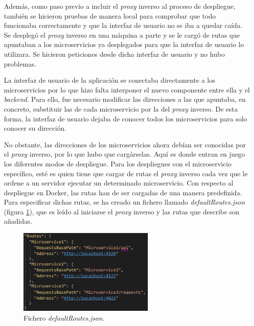 \documentclass[11pt,spanish,listoffigures]{tfgetsinf}
\begin{document}
Además, como paso previo a incluir el \emph{proxy} inverso al proceso de despliegue, también se hicieron pruebas de manera local para comprobar que todo funcionaba correctamente y que la interfaz de usuario no se iba a quedar caída. Se desplegó el \emph{proxy} inverso en una máquina a parte y se le cargó de rutas que apuntaban a los microservicios ya desplegados para que la interfaz de usuario lo utilizara. Se hicieron peticiones desde dicha interfaz de usuario y no hubo problemas.

La interfaz de usuario de la aplicación se conectaba directamente a los microservicios por lo que hizo falta interponer el nuevo componente entre ella y el \emph{backend}. Para ello, fue necesario modificar las direcciones a las que apuntaba, en concreto, substituir las de cada microservicio por la del \emph{proxy} inverso. De esta forma, la interfaz de usuario dejaba de conocer todos los microservicios para solo conocer su dirección.

No obstante, las direcciones de los microservicios ahora debían ser conocidas por el \emph{proxy} inverso, por lo que hubo que cargárselas. Aquí es donde entran en juego los diferentes modos de despliegue. Para los despliegues con el microservicio específico, esté es quien tiene que cargar de rutas el \emph{proxy} inverso cada vez que le ordene a un servidor ejecutar un determinado microservicio. Con respecto al despliegue en Docker, las rutas han de ser cargadas de una manera predefinida. Para especificar dichas rutas, se ha creado un fichero llamado \emph{defaultRoutes.json} (figura \ref{defaultRoutes}), que es leído al iniciarse el \emph{proxy} inverso y las rutas que describe son añadidas.

\begin{figure}[ht]
\centering
\includegraphics[width=0.6\textwidth]{imagenes/defaultRoutes}
\caption{Fichero \emph{defaultRoutes.json}.}
	\label{defaultRoutes}
\end{figure}

\end{document}
